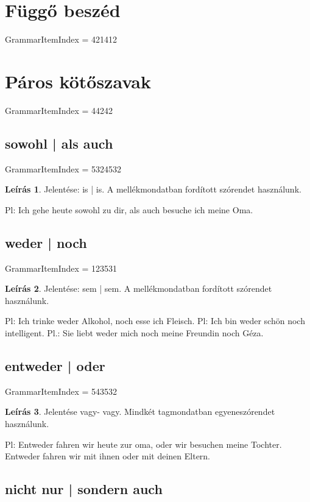 \documentclass{article}
\theoremstyle{definition}
\newtheorem*{desc}{Leírás}
\begin{document}
\section{Függő beszéd}

GrammarItemIndex = 421412

\section{Páros kötőszavak}

GrammarItemIndex = 44242

\subsection{sowohl | als auch}

GrammarItemIndex = 5324532

\begin{desc}
Jelentése: is | is. A mellékmondatban fordított szórendet használunk.

Pl: Ich gehe heute sowohl zu dir, als auch besuche ich meine Oma. 
\end{desc}

\subsection{weder | noch}

GrammarItemIndex = 123531

\begin{desc}
Jelentése: sem | sem. A mellékmondatban fordított szórendet használunk.

Pl: Ich trinke weder Alkohol, noch esse ich Fleisch.
Pl: Ich bin weder schön noch intelligent.
Pl.: Sie liebt weder mich noch meine Freundin noch Géza.
\end{desc}

\subsection{entweder | oder}

GrammarItemIndex = 543532

\begin{desc}
Jelentése vagy- vagy. Mindkét tagmondatban egyeneszórendet használunk.

Pl: Entweder fahren wir heute zur oma, oder wir besuchen meine Tochter.
Entweder fahren wir mit ihnen oder mit deinen Eltern.
\end{desc}

\subsection{nicht nur | sondern auch}
\end{document}
